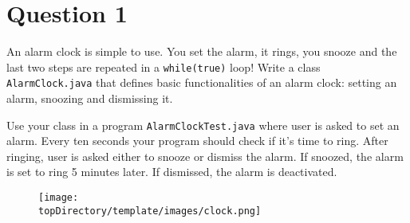%
%
%
%

\section*{Question 1}
An alarm clock is simple to use.
You set the alarm, it rings, you snooze and the last two steps are repeated in a \texttt{while(true)} loop! Write a class \texttt{AlarmClock.java} that defines basic functionalities of an alarm clock: setting an alarm, snoozing and dismissing it.

Use your class in a program \texttt{AlarmClockTest.java} where user is asked to set an alarm.
Every ten seconds your program should check if it's time to ring.
After ringing, user is asked either to snooze or dismiss the alarm.
If snoozed, the alarm is set to ring 5 minutes later.
If dismissed, the alarm is deactivated.

\begin{figure}[H]\centering
\texttt{[image: \\topDirectory/template/images/clock.png]}
\end{figure}
\newpage
